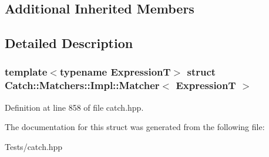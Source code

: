 \subsection*{Additional Inherited Members}


\subsection{Detailed Description}
\subsubsection*{template$<$typename ExpressionT$>$\newline
struct Catch\+::\+Matchers\+::\+Impl\+::\+Matcher$<$ Expression\+T $>$}



Definition at line 858 of file catch.\+hpp.



The documentation for this struct was generated from the following file\+:\begin{DoxyCompactItemize}
\item 
Tests/catch.\+hpp\end{DoxyCompactItemize}
